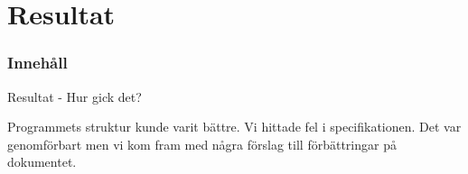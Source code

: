 \section{Resultat}
\begin{frame}
\frametitle{Innehåll}
\tableofcontents[currentsection]
\end{frame}

\begin{frame}{Resultat - Hur gick det?}

Programmets struktur kunde varit bättre. Vi hittade fel i specifikationen. Det var genomförbart men vi kom fram med några förslag till förbättringar på dokumentet.


\end{frame}
